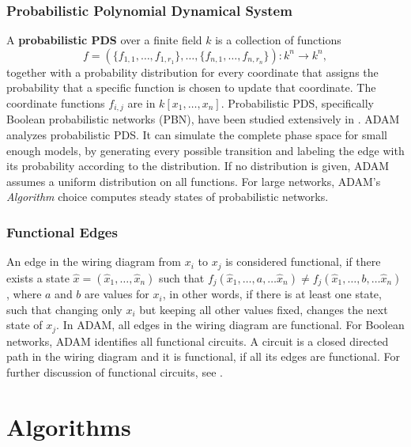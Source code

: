 \documentclass[11pt]{amsart}
\begin{document}
\subsubsection{Probabilistic Polynomial Dynamical System}
A {\bf probabilistic PDS} over a finite field $k$ is a collection of functions
$$f = (\{f_{1,1}, \ldots, f_{1, r_1}\}, \ldots, \{f_{n, 1}, \ldots, f_{n, r_n}
\}) : k^n \rightarrow k^n,$$
together with a probability distribution for every coordinate that assigns the
probability that a specific function is chosen to update that coordinate.
The coordinate functions $f_{i,j}$ are in $k[x_1, \ldots , x_n]$.
Probabilistic PDS, specifically Boolean probabilistic networks (PBN), have been studied
extensively in \cite{shmulevich}.
ADAM analyzes probabilistic PDS. It can simulate the
complete phase space for small enough models, by generating every possible
transition and labeling the edge with its probability according to the
distribution. If no distribution is given, ADAM assumes a uniform distribution
on all functions. For large networks, ADAM's {\it Algorithm} choice computes
steady states of probabilistic networks.
\subsubsection{Functional Edges} \label{sec:func}
An edge in the wiring diagram from $x_i$ to $x_j$ is considered
functional, if there exists a state $\hat x = (\hat x_1,  \ldots, \hat x_n)$ such
that $f_j( \hat x_1,  \ldots, a, \ldots \hat x_n) \neq f_j(\hat x_1, \ldots, b, \ldots
\hat x_n)$, where $a$ and $b$ are values for $x_i$, in other words, if there
is at least one state, such that changing only $x_i$ but keeping all other
values fixed, changes the next state of $x_j$.
In ADAM, all edges in the wiring diagram are functional.
For Boolean networks, ADAM identifies all functional circuits. A circuit is a
closed directed path in the wiring diagram and it is functional, if all its
edges are functional. For further discussion of
functional circuits, see \cite{Chaouiya}.
\section{Algorithms}
\end{document}
